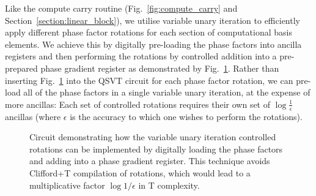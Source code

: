 \documentclass[a4paper,twocolumn,,accepted=2025-05-27]{quantumarticle}
\theoremstyle{empty}
\begin{document}
Like the compute carry routine (Fig.~\ref{fig:compute_carry} and Section~\ref{section:linear_block}), we utilise variable unary iteration \cite{Sanders_2020} to efficiently apply different phase factor rotations for each section of computational basis elements. We achieve this by digitally pre-loading the phase factors into ancilla registers and then performing the rotations by controlled addition into a pre-prepared phase gradient register \cite{gidneyHalvingCostQuantum2018} as demonstrated by Fig.~\ref{fig:phase-gradient}. Rather than inserting Fig.~\ref{fig:phase-gradient} into the QSVT circuit for each phase factor rotation, we can pre-load all of the phase factors in a single variable unary iteration, at the expense of more ancillas: Each set of controlled rotations requires their own set of $\log \frac{1}{\epsilon}$ ancillas (where $\epsilon$ is the accuracy to which one wishes to perform the rotations). %
\begin{figure}
\centering

\caption{\label{fig:phase-gradient} Circuit demonstrating how the variable unary iteration controlled rotations can be implemented by digitally loading the phase factors and adding into a phase gradient register. This technique avoids Clifford+T compilation of rotations\cite{Bocharov_2015}, which would lead to a multiplicative factor $\log 1/\epsilon$ in T complexity.}
\end{figure}
\end{document}
